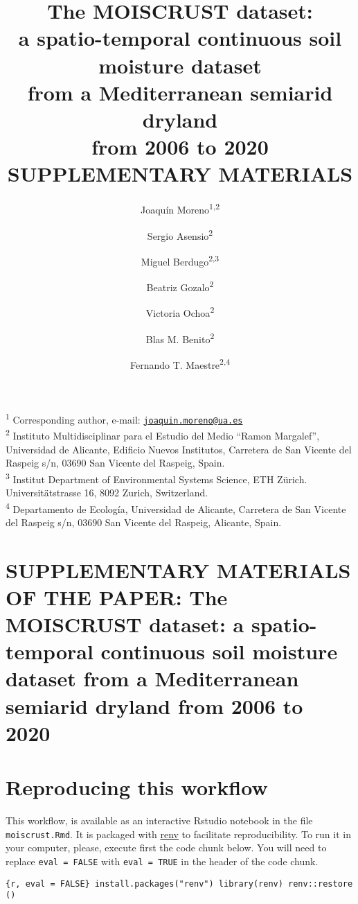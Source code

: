 \documentclass[]{article}
\title{The MOISCRUST dataset:\\
a spatio-temporal continuous soil moisture dataset\\
from a Mediterranean semiarid dryland\\
from 2006 to 2020\\
SUPPLEMENTARY MATERIALS}
\author{Joaquín Moreno\textsuperscript{1,2} \and Sergio Asensio\textsuperscript{2} \and Miguel Berdugo\textsuperscript{2,3} \and Beatriz Gozalo\textsuperscript{2} \and Victoria Ochoa\textsuperscript{2} \and Blas M. Benito\textsuperscript{2} \and Fernando T. Maestre\textsuperscript{2,4}}
\date{}
\begin{document}
\maketitle

{
\setcounter{tocdepth}{2}
\tableofcontents
}
\textsuperscript{1} Corresponding author, e-mail:
\href{mailto:joaquin.moreno@ua.es}{\nolinkurl{joaquin.moreno@ua.es}}\\
\textsuperscript{2} Instituto Multidisciplinar para el Estudio del Medio
``Ramon Margalef'', Universidad de Alicante, Edificio Nuevos Institutos,
Carretera de San Vicente del Raspeig s/n, 03690 San Vicente del Raspeig,
Spain.\\
\textsuperscript{3} Institut Department of Environmental Systems
Science, ETH Zürich. Universitätstrasse 16, 8092 Zurich, Switzerland.\\
\textsuperscript{4} Departamento de Ecología, Universidad de Alicante,
Carretera de San Vicente del Raspeig s/n, 03690 San Vicente del Raspeig,
Alicante, Spain.

\hypertarget{supplementary-materials-of-the-paper-the-moiscrust-dataset-a-spatio-temporal-continuous-soil-moisture-dataset-from-a-mediterranean-semiarid-dryland-from-2006-to-2020}{%
\section{SUPPLEMENTARY MATERIALS OF THE PAPER: The MOISCRUST dataset: a
spatio-temporal continuous soil moisture dataset from a Mediterranean
semiarid dryland from 2006 to
2020}\label{supplementary-materials-of-the-paper-the-moiscrust-dataset-a-spatio-temporal-continuous-soil-moisture-dataset-from-a-mediterranean-semiarid-dryland-from-2006-to-2020}}

\hypertarget{reproducing-this-workflow}{%
\section{Reproducing this workflow}\label{reproducing-this-workflow}}

This workflow, is available as an interactive Rstudio notebook in the
file \texttt{moiscrust.Rmd}. It is packaged with
\href{https://cran.r-project.org/package=renv}{renv} to facilitate
reproducibility. To run it in your computer, please, execute first the
code chunk below. You will need to replace \texttt{eval\ =\ FALSE} with
\texttt{eval\ =\ TRUE} in the header of the code chunk.

\texttt{\{r,\ eval\ =\ FALSE\}\ install.packages("renv")\ library(renv)\ renv::restore()}
\end{document}
